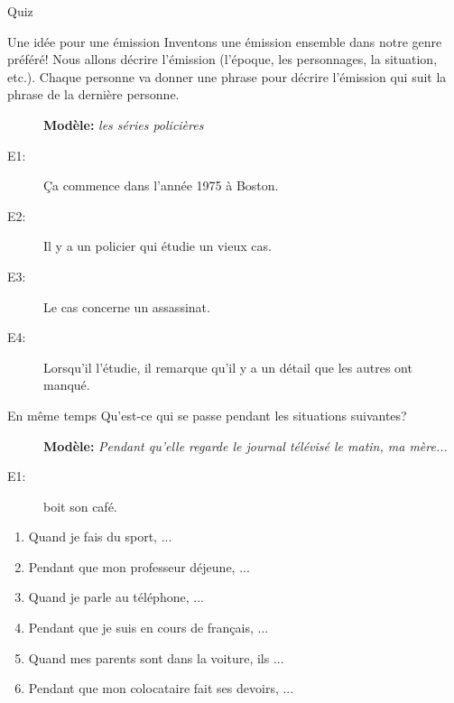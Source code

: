\documentclass{beamer}
\begin{document}
  \begin{frame}{}
    \begin{center}
      \Large Quiz
    \end{center}
  \end{frame}

  \begin{frame}{Une idée pour une émission}
    Inventons une émission ensemble dans notre genre préféré!
    Nous allons décrire l'émission (l'époque, les personnages, la situation, etc.).
    Chaque personne va donner une phrase pour décrire l'émission qui suit la phrase de la dernière personne.
    \begin{description}
      \item[] \textbf{Modèle:} \emph{les séries policières}
      \item[E1:] Ça commence dans l'année 1975 à Boston.
      \item[E2:] Il y a un policier qui étudie un vieux cas.
      \item[E3:] Le cas concerne un assassinat.
      \item[E4:] Lorsqu'il l'étudie, il remarque qu'il y a un détail que les autres ont manqué.
    \end{description}
  \end{frame}

  \begin{frame}{En même temps }
    Qu'est-ce qui se passe pendant les situations suivantes?
    \begin{description}
      \item[] \textbf{Modèle:} \emph{Pendant qu'elle regarde le journal télévisé le matin, ma mère...}
      \item[E1:] boit son café.
    \end{description}
    \begin{enumerate}
      \item Quand je fais du sport, ...
      \item Pendant que mon professeur déjeune, ...
      \item Quand je parle au téléphone, ...
      \item Pendant que je suis en cours de français, ...
      \item Quand mes parents sont dans la voiture, ils ...
      \item Pendant que mon colocataire fait ses devoirs, ...
    \end{enumerate}
  \end{frame}
\end{document}
